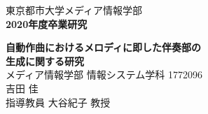 \documentclass[fleqn,11pt]{jreport}
\begin{document}
\baselineskip 21.5pt

\begin{titlepage}
\vspace*{3cm}
\begin{center}
{\Large\gt 東京都市大学メディア情報学部}\\
\vspace*{0.5cm}
{\Large\bf 2020年度卒業研究}\\
\vspace{1.5cm}


{\huge\bf 自動作曲におけるメロディに即した伴奏部の}\\
\vspace{0.5cm}
{\huge\bf 生成に関する研究}\\

\vspace{9cm}
{\Large メディア情報学部 情報システム学科 1772096}\\
{\Large 吉田 佳}\\
\vspace*{0.5cm}
{\Large 指導教員 大谷紀子 教授}\\
\end{center}
\end{titlepage}

\tableofcontents
\cleardoublepage











%


\appendix


\end{document}
